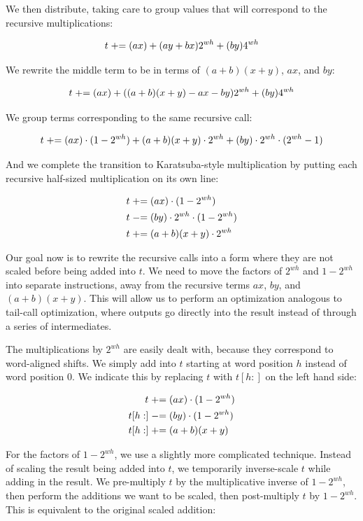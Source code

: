 \documentclass[onecolumn]{quantumarticle}
\begin{document}
We then distribute, taking care to group values that will correspond to the recursive multiplications:

$$t \mathrel{+}= (ax) + (ay + bx) 2^{wh} + (by)4^{wh}$$

We rewrite the middle term to be in terms of $(a+b)(x + y)$, $ax$, and $by$:

$$t \mathrel{+}= (ax) + ((a+b)(x + y) - ax - by) 2^{wh} + (by)4^{wh}$$

We group terms corresponding to the same recursive call:

$$t \mathrel{+}= (ax) \cdot (1 - 2^{wh}) + (a+b)(x + y) \cdot 2^{wh} + (by) \cdot 2^{wh} \cdot (2^{wh}-1)$$

And we complete the transition to Karatsuba-style multiplication by putting each recursive half-sized multiplication on its own line:

$$\begin{aligned}
t &\mathrel{+}= (ax) \cdot (1 - 2^{wh})
\\
t &\mathrel{-}= (by) \cdot 2^{wh} \cdot (1-2^{wh})
\\
t &\mathrel{+}= (a+b)(x + y) \cdot 2^{wh}
\end{aligned}$$

Our goal now is to rewrite the recursive calls into a form where they are not scaled before being added into $t$.
We need to move the factors of $2^{wh}$ and $1-2^{wh}$ into separate instructions, away from the recursive terms $ax$, $by$, and $(a+b)(x+y)$.
This will allow us to perform an optimization analogous to tail-call optimization, where outputs go directly into the result instead of through a series of intermediates.

The multiplications by $2^{wh}$ are easily dealt with, because they correspond to word-aligned shifts.
We simply add into $t$ starting at word position $h$ instead of word position 0.
We indicate this by replacing $t$ with $t[h:]$ on the left hand side:

$$\begin{aligned}
t &\mathrel{+}= (ax) \cdot (1 - 2^{wh})
\\
t[h:] &\mathrel{-}= (by) \cdot (1 - 2^{wh})
\\
t[h:] &\mathrel{+}= (a+b)(x + y)
\end{aligned}$$

For the factors of $1-2^{wh}$, we use a slightly more complicated technique.
Instead of scaling the result being added into $t$, we temporarily inverse-scale $t$ while adding in the result.
We pre-multiply $t$ by the multiplicative inverse of $1 - 2^{wh}$, then perform the additions we want to be scaled, then post-multiply $t$ by $1 - 2^{wh}$.
This is equivalent to the original scaled addition:
\end{document}
